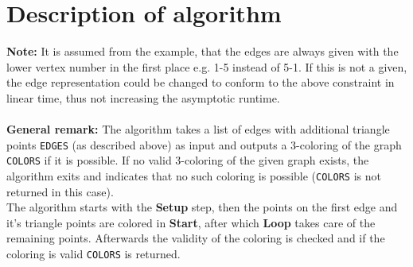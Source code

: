 \documentclass[english]{scrartcl}
\newcommand{\code}{\texttt}
\begin{document}
\section{Description of algorithm}
\label{sec:description}
\textbf{Note:} It is assumed from the example, that the edges are always given with the lower vertex number in the first place e.g. 1-5 instead of 5-1. If this is not a given, the edge representation could be changed to conform to the above constraint in linear time, thus not increasing the asymptotic runtime.
\\ \\
\textbf{General remark:} The algorithm takes a list of edges with additional triangle points \code{EDGES} (as described above) as input and outputs a 3-coloring of the graph \code{COLORS} if it is possible. If no valid 3-coloring of the given graph exists, the algorithm exits and indicates that no such coloring is possible (\code{COLORS} is not returned in this case).
\\
The algorithm starts with the \textbf{Setup} step, then the points on the first edge and it's triangle points are colored in \textbf{Start}, after which \textbf{Loop} takes care of the remaining points. Afterwards the validity of the coloring is checked and if the coloring is valid \code{COLORS} is returned.
\end{document}
